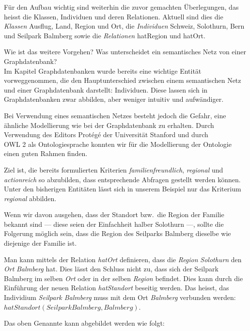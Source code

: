 Für den Aufbau wichtig sind weiterhin die zuvor gemachten Überlegungen, das heisst die Klassen, Individuen und deren Relationen. Aktuell sind dies die \textit{Klassen} Ausflug, Land, Region und Ort, die \textit{Individuen} Schweiz, Solothurn, Bern und Seilpark Balmberg sowie die \textit{Relationen} hatRegion und hatOrt.

Wie ist das weitere Vorgehen? Was unterscheidet ein semantisches Netz von einer Graphdatenbank?\\
Im Kapitel Graphdatenbanken wurde bereits eine wichtige Entität vorweggenommen, die den Hauptunterschied zwischen einem semantischen Netz und einer Graphdatenbank darstellt: Individuen. Diese lassen sich in Graphdatenbanken zwar abbilden, aber weniger intuitiv und aufwändiger.

Bei Verwendung eines semantischen Netzes besteht jedoch die Gefahr, eine ähnliche Modellierung wie bei der Graphdatenbank zu erhalten. Durch Verwendung des Editors Protégé der Universität Stanford und durch\\
OWL 2 als Ontologiesprache konnten wir für die Modellierung der Ontologie einen guten Rahmen finden.

Ziel ist, die bereits formulierten Kriterien \textit{familienfreundlich}, \textit{regional} und \textit{actionreich} so abzubilden, dass entsprechende Abfragen gestellt werden können.\\
Unter den bisherigen Entitäten lässt sich in unserem Beispiel nur das Kriterium \textit{regional} abbilden.

Wenn wir davon ausgehen, dass der Standort bzw.\ die Region der Familie bekannt sind --- diese seien der Einfachheit halber Solothurn ---, sollte die Folgerung möglich sein, dass die Region des Seilparks Balmberg dieselbe wie diejenige der Familie ist.

Man kann mittels der Relation \textit{hatOrt} definieren, dass die \textit{Region} \textit{Solothurn} den \textit{Ort} \textit{Balmberg} hat. Dies lässt den Schluss nicht zu, dass sich der Seilpark Balmberg im selben \textit{Ort} oder in der selben \textit{Region} befindet. Dies kann durch die Einführung der neuen Relation \textit{hatStandort} beseitig werden. Das heisst, das Individium \textit{Seilpark Balmberg} muss mit dem Ort \textit{Balmberg} verbunden werden: $ hatStandort(SeilparkBalmberg, Balmberg) $.

\newpage

Das oben Genannte kann abgebildet werden wie folgt:

